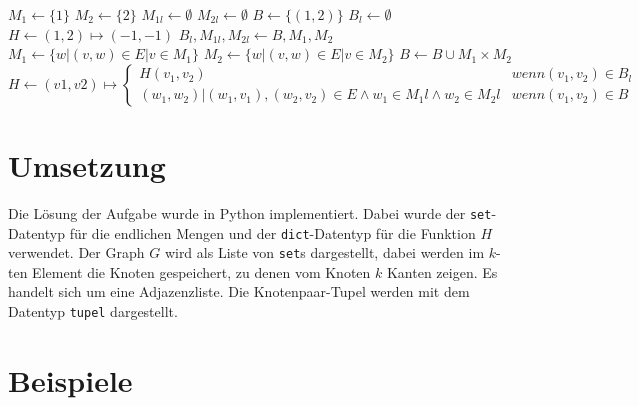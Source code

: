 \documentclass[a4paper,10pt,ngerman]{scrartcl}
\begin{document}
\begin{algorithmic}
  \State$M_1 \gets \{1\}$
  \State$M_2 \gets \{2\}$
  \State$M_{1l} \gets \emptyset$
  \State$M_{2l} \gets \emptyset$
  \State$B \gets \{(1, 2)\}$
  \State$B_l \gets \emptyset$
  \State$H \gets (1, 2) \mapsto (-1, -1)$
  \State$B_l, M_{1l}, M_{2l} \gets B, M_1, M_2$
  \State$M_1 \gets \{w | (v, w) \in E | v \in M_1\} $
  \State$M_2 \gets \{w | (v, w) \in E | v \in M_2\} $
  \State$B \gets B \cup M_1 \times M_2$
  \State$H \gets (v1, v2) \mapsto \begin{cases}
      H(v_1, v_2)                                                                 & wenn (v_1,v_2) \in B_l \\
      (w_1, w_2)|(w_1,v_1), (w_2,v_2) \in E \land w_1 \in M_1l \land w_2 \in M_2l & wenn (v_1,v_2) \in B
    \end{cases}$
  \EndWhile
\end{algorithmic}
\section{Umsetzung}
Die Lösung der Aufgabe wurde in Python implementiert. Dabei wurde der
\lstinline|set|-Datentyp für die endlichen Mengen und der
\lstinline|dict|-Datentyp für die Funktion $H$ verwendet. Der Graph $G$ wird
als Liste von \lstinline|set|s dargestellt, dabei werden im $k$-ten Element die
Knoten gespeichert, zu denen vom Knoten $k$ Kanten zeigen. Es handelt sich um
eine Adjazenzliste. Die Knotenpaar-Tupel werden mit dem Datentyp
\lstinline|tupel| dargestellt. \\

\section{Beispiele}
\end{document}
